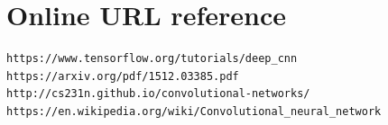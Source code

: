 \documentclass[twocolumn]{webofc}
\begin{document}
\section*{Online URL reference }



\begin{lstlisting}
https://www.tensorflow.org/tutorials/deep_cnn
https://arxiv.org/pdf/1512.03385.pdf
http://cs231n.github.io/convolutional-networks/
https://en.wikipedia.org/wiki/Convolutional_neural_network
\end{lstlisting}





%
% 


\end{document}

